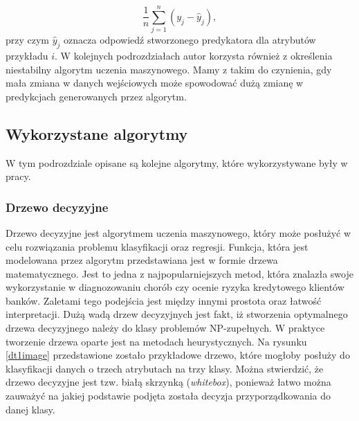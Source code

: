 \begin{equation}
\frac{1}{n} \sum_{j=1}^{n}(y_j - \hat{y}_j), 
\end{equation}
przy czym $\hat{y}_j$ oznacza odpowiedź stworzonego predykatora dla atrybutów przykładu $i$.
W kolejnych podrozdziałach autor korzysta również z określenia niestabilny algorytm uczenia maszynowego. Mamy z takim do czynienia, gdy mała zmiana w danych wejściowych może spowodować dużą zmianę w predykcjach generowanych przez algorytm\cite{ensemble}.

\subsection{Wykorzystane algorytmy}
W tym podrozdziale opisane są kolejne algorytmy, które wykorzystywane były w pracy.
\subsubsection{Drzewo decyzyjne}
Drzewo decyzyjne jest algorytmem uczenia maszynowego, który może posłużyć w celu rozwiązania problemu klasyfikacji oraz regresji. Funkcja, która jest modelowana przez algorytm przedstawiana jest w formie drzewa matematycznego. Jest to jedna z najpopularniejszych metod, która znalazła swoje wykorzystanie w diagnozowaniu chorób czy ocenie ryzyka kredytowego klientów banków\cite{mitchel}. Zaletami tego podejścia jest między innymi  prostota oraz łatwość interpretacji. Dużą wadą drzew decyzyjnych jest fakt, iż stworzenia optymalnego drzewa decyzyjnego należy do klasy problemów NP-zupełnych. W praktyce tworzenie drzewa oparte jest na metodach heurystycznych\cite{dtscikit}. Na rysunku \ref{dt1image} przedstawione zostało przykładowe drzewo, które mogłoby posłuży do klasyfikacji danych o trzech atrybutach na trzy klasy. Można stwierdzić, że drzewo decyzyjne jest tzw. białą skrzynką (\textit{whitebox}), ponieważ łatwo można zauważyć na jakiej podstawie podjęta została decyzja przyporządkowania do danej klasy.

